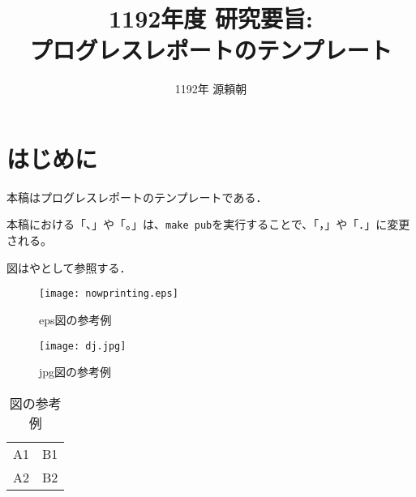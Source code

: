 \documentclass[onecolumn]{preport}
\title{1192年度 研究要旨: \\
プログレスレポートのテンプレート}
\author{1192年 源頼朝}
\begin{document}
\pagestyle{empty}
\maketitle
\thispagestyle{empty}
\sloppy

\section{はじめに}

本稿はプログレスレポートのテンプレートである\cite{Sakai}．

本稿における「、」や「。」は、\verb|make pub|を実行することで、「，」や「．」に変更される。

図はやとして参照する．

\begin{figure}[tbh]
 \begin{center}
  \begin{minipage}{0.3\columnwidth}
   \texttt{[image: nowprinting.eps]}
   \caption{eps図の参考例}
  \end{minipage}
  \hspace{0.15\columnwidth}
  \begin{minipage}{0.3\columnwidth}
   \texttt{[image: dj.jpg]}
   \caption{jpg図の参考例}
  \end{minipage}
  \label{figure:nowprinting}
 \end{center}
\end{figure}

\begin{table}[tbh]
 \begin{center}
  \begin{tabular}{|l|r|} \hline
  A1 & B1 \\
  A2 & B2 \\ \hline
  \end{tabular}
  \caption{図の参考例}
  \label{table:sample}
 \end{center}
\end{table}
\end{document}
